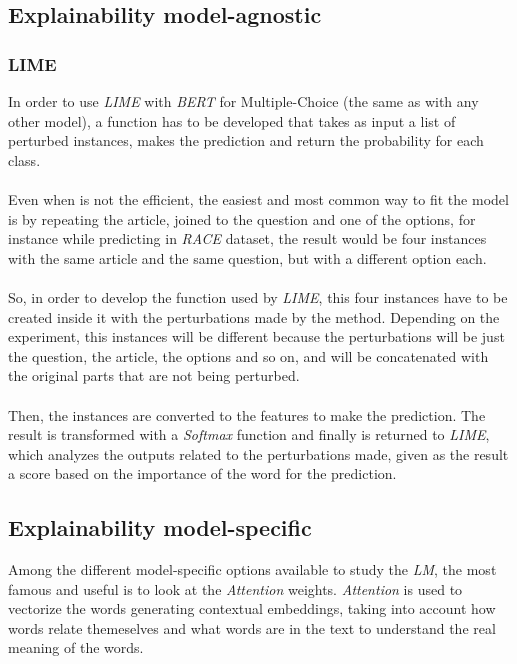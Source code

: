 \subsection{Explainability model-agnostic}
\label{sec:ModelAgnostic}
\noindent

\subsubsection{LIME}
\label{sec:Lime}
\noindent In order to use \emph{LIME} with \emph{BERT} for Multiple-Choice (the same as with any other model), a function has to be developed that takes as input a list of perturbed instances, makes the prediction and return the probability for each class. 
\paragraph{}
Even when is not the efficient, the easiest and most common way to fit the model is by repeating the article, joined to the question and one of the options, for instance while predicting in \emph{RACE} dataset, the result would be four instances with the same article and the same question, but with a different option each. 
\paragraph{}
So, in order to develop the function used by \emph{LIME}, this four instances have to be created inside it with the perturbations made by the method. Depending on the experiment, this instances will be different because the perturbations will be just the question, the article, the options and so on, and will be concatenated with the original parts that are not being perturbed.
\paragraph{}
Then, the instances are converted to the features to make the prediction. The result is transformed with a \emph{Softmax} function and finally is returned to \emph{LIME}, which analyzes the outputs related to the perturbations made, given as the result a score based on the importance of the word for the prediction.




\subsection{Explainability model-specific}
\label{sec:ModelSpecific} 
\noindent Among the different model-specific options available to study the \emph{LM}, the most famous and useful is to look at the \emph{Attention} weights. \emph{Attention} is used to vectorize the words generating contextual embeddings, taking into account how words relate themeselves and what words are in the text to understand the real meaning of the words.
